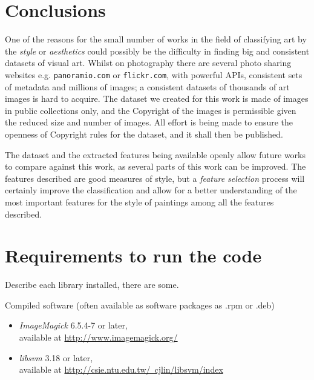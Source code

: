 \documentclass[11pt,a4paper,twoside,openright,draft]{report}
\renewcommand{\bibname}{References}
\begin{document}
\chapter{Conclusions}
\begin{multicols}{2}

One of the reasons for the small number of works in the field of classifying
art by the \emph{style} or \emph{aesthetics} could possibly be the difficulty
in finding big and consistent datasets of visual art.  Whilst on photography
there are several photo sharing websites e.g. \texttt{panoramio.com} or
\texttt{flickr.com}, with powerful APIs, consistent sets of metadata and
millions of images;  a consistent datasets of thousands of art images is hard
to acquire.  The dataset we created for this work is made of images in public
collections only, and the Copyright of the images is permissible given the
reduced size and number of images.  All effort is being made to ensure the
openness of Copyright rules for the dataset, and it shall then be published.

The dataset and the extracted features being available openly allow future
works to compare against this work, as several parts of this work can be
improved.  The features described are good measures of style, but a
\emph{feature selection} process will certainly improve the classification and
allow for a better understanding of the most important features for the style
of paintings among all the features described.

\end{multicols}

\newpage
{}
\addcontentsline{toc}{chapter}{\bibname}



\appendix

\chapter{Requirements to run the code}
\label{chap:requirements}

Describe each library installed, there are some.

Compiled software (often available as software packages as .rpm or .deb)
\begin{itemize}
\item[]\emph{ImageMagick} 6.5.4-7 or later, \\
available at \href{http://www.imagemagick.org/}{http://www.imagemagick.org/}

\item[]\emph{libsvm} 3.18 or later, \\
available at \href{http://csie.ntu.edu.tw/~cjlin/libsvm/index}
{http://csie.ntu.edu.tw/~cjlin/libsvm/index}
\end{itemize}
\end{document}
